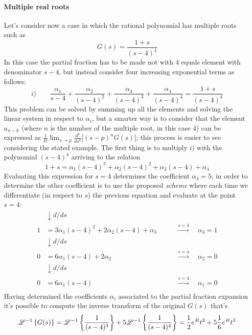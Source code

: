 	\paragraph{Multiple real roots} Let's consider now a case in which the rational polynomial has multiple roots such as
	\[ G(s) = \frac{1+s}{(s-4)^4} \]
	In this case the partial fraction has to be made not with 4 equals element with denominator $s-4$, but instead consider four increasing exponential terms as follows:
	\[ i) \qquad \frac{\alpha_1}{s-4} + \frac{\alpha_2}{(s-4)^2} + \frac{\alpha_3}{(s-4)^3} + \frac{\alpha_4}{(s-4)^4} = \frac{1+s}{(s-4)^4} \]
	This problem can be solved by summing up all the elements and solving the linear system in respect to $\alpha_i$, but a smarter way is to consider that the element $a_{n-k}$ (where $n$ is the number of the multiple root, in this case $4$) can be expressed as $\frac 1 {k!} \lim_{s\rightarrow p} \frac{d^k}{ds^k} \big[ (s-p)^n G(s) \big]$; this process is easier to see considering the stated example. The first thing is to multiply $i)$ with the polynomial $(s-4)^4$ arriving to the relation
	\[ 1+s = \alpha_1(s-4)^3 + \alpha_2(s-4)^2 + \alpha_3(s-4) + \alpha_4 \]
	Evaluating this expression for $s=4$ determines the coefficient $\alpha_4 = 5$; in order to determine the other coefficient is to use the proposed \textit{scheme} where each time we differentiate (in respect to $s$) the previous equation and evaluate at the point $s=4$:
	\begin{align*}
		& \downarrow d/ds \\ 
		1 & = 3 \alpha_1 (s-4)^2 + 2 \alpha_2(s-4) + \alpha_3 \qquad & \xrightarrow{s=4} \quad \alpha_3 = 1 \\
		& \downarrow d/ds \\ 
		0 & = 6 \alpha_1 (s-4) + 2 \alpha_2 \qquad & \xrightarrow{s=4} \quad \alpha_2 = 0 \\
		& \downarrow d/ds \\ 
		0 & = 6 \alpha_1 (s-4) \qquad & \xrightarrow{s=4} \quad \alpha_1 = 0 \\
	\end{align*}
	Having determined the coefficients $\alpha_i$ associated to the partial fraction expansion it's possible to compute the inverse transform of the original $G(s)$ that's
	\[ \mathscr{L}^{-1} \left\{ G(s) \right\} = \mathscr{L}^{-1} \left\{ \frac 1 {(s-4)^3} \right\} +5 \mathscr{L}^{-1} \left\{ \frac 1 {(s-4)^4 } \right\} = \frac 1 2e^{4t}t^2 + 5 \frac 1 6 e^{4t}t^3   \]
	
